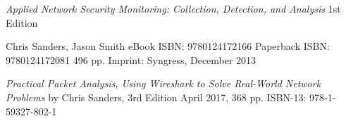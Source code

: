 \documentclass[Screen16to9,17pt]{foils}
\begin{document}


\emph{Applied Network Security Monitoring: Collection, Detection, and Analysis}
1st Edition

Chris Sanders, Jason Smith
eBook ISBN: 9780124172166
Paperback ISBN: 9780124172081 496 pp.
Imprint: Syngress, December 2013

{\footnotesize{}}


\emph{Practical Packet Analysis,
Using Wireshark to Solve Real-World Network Problems}
by Chris Sanders, 3rd Edition
April 2017, 368 pp.
ISBN-13:
978-1-59327-802-1

\end{document}
